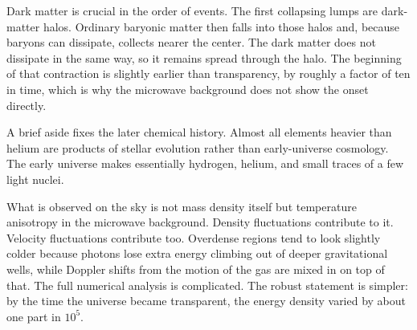 Dark matter is crucial in the order of events. The first collapsing lumps are dark-matter halos. Ordinary baryonic matter then falls into those halos and, because baryons can dissipate, collects nearer the center. The dark matter does not dissipate in the same way, so it remains spread through the halo. The beginning of that contraction is slightly earlier than transparency, by roughly a factor of ten in time, which is why the microwave background does not show the onset directly.

A brief aside fixes the later chemical history. Almost all elements heavier than helium are products of stellar evolution rather than early-universe cosmology. The early universe makes essentially hydrogen, helium, and small traces of a few light nuclei.

What is observed on the sky is not mass density itself but temperature anisotropy in the microwave background. Density fluctuations contribute to it. Velocity fluctuations contribute too. Overdense regions tend to look slightly colder because photons lose extra energy climbing out of deeper gravitational wells, while Doppler shifts from the motion of the gas are mixed in on top of that. The full numerical analysis is complicated. The robust statement is simpler: by the time the universe became transparent, the energy density varied by about one part in \(10^5\).

\begin{classroomqa}
\end{classroomqa}

\begin{classroomqa}
\end{classroomqa}

\begin{classroomqa}
\end{classroomqa}

